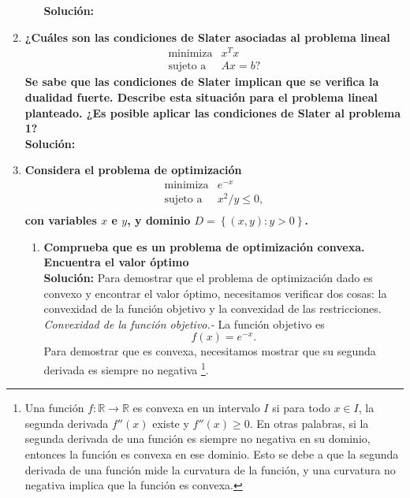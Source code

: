 \begin{enumerate}
\begin{enumerate}[\bfseries (a)]
	    \textbf{Solución:}

    \end{enumerate}

    \item \textbf{\boldmath ¿Cuáles son las condiciones de Slater asociadas al problema lineal
    $$
    \begin{array}{ll}
	\text{minimiza} & x^Tx\\
	\text{sujeto a} & Ax=b?
    \end{array}
    $$
    Se sabe que las condiciones de Slater implican que se verifica la dualidad fuerte. Describe esta situación para el problema lineal planteado. ¿Es posible aplicar las condiciones de Slater al problema 1?}\\

	\textbf{Solución:}

    \item \textbf{\boldmath Considera el problema de optimización
    $$
    \begin{array}{ll}
	\text{minimiza} & e^{-x}\\
	\text{sujeto a} & x^2/y\leq 0,\\
    \end{array}
    $$
    con variables $x$ e $y$, y dominio $D=\left\{(x,y):y>0\right\}$.}
    \begin{enumerate}[\bfseries (a)]

	\item \textbf{\boldmath Comprueba que es un problema de optimización convexa. Encuentra el valor óptimo}\\

	    \textbf{Solución:} Para demostrar que el problema de optimización dado es convexo y encontrar el valor óptimo, necesitamos verificar dos cosas: la convexidad de la función objetivo y la convexidad de las restricciones.\\

	    \textit{Convexidad de la función objetivo.-} La función objetivo es 
	    $$f(x) = e^{-x}.$$ 
	    Para demostrar que es convexa, necesitamos mostrar que su segunda derivada es siempre no negativa 
	    \footnote{
		Una función $f: \mathbb{R} \rightarrow \mathbb{R}$ es convexa en un intervalo $I$ si para todo $x \in I$, la segunda derivada $f''(x)$ existe y $f''(x) \geq 0$. En otras palabras, si la segunda derivada de una función es siempre no negativa en su dominio, entonces la función es convexa en ese dominio. Esto se debe a que la segunda derivada de una función mide la curvatura de la función, y una curvatura no negativa implica que la función es convexa.
	    }. 


\end{enumerate}
\end{enumerate}
